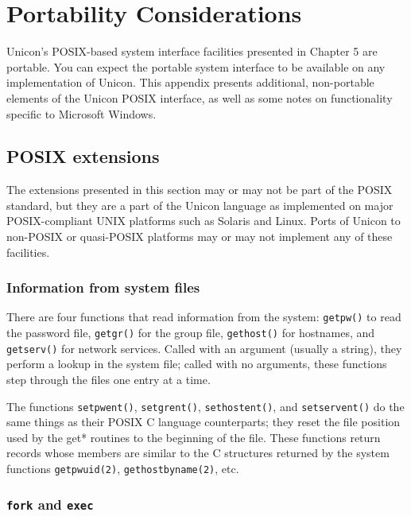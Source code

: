 \chapter{Portability Considerations}

Unicon's POSIX-based system interface facilities presented in Chapter
5 are portable.  You can expect the portable system interface to be
available on any implementation of Unicon. This appendix presents
additional, non-portable elements of the Unicon POSIX interface, as
well as some notes on functionality specific to Microsoft Windows.

\section{POSIX extensions}

The extensions presented in this section may
or may not be part of the POSIX standard, but they are a part of the
Unicon language as implemented on major POSIX-compliant UNIX platforms
such as Solaris and Linux. Ports of Unicon to non-POSIX or quasi-POSIX
platforms may or may not implement any of these facilities.

\subsection*{Information from system files}

There are four functions that read information from the system:
\texttt{getpw()} to read the password file, \texttt{getgr()} for the
group file, \texttt{gethost()} for hostnames, and \texttt{getserv()}
for network services. Called with an argument (usually a string), they
perform a lookup in the system file; called with no arguments,
these functions step through the files one entry at a time.

The functions \texttt{setpwent()}, \texttt{setgrent()},
\texttt{sethostent()}, and \texttt{setservent()} do the same things as
their POSIX C language counterparts; they reset the file position used
by the get* routines to the beginning of the file.  These functions
return records whose members are similar to the C structures returned
by the system functions \texttt{getpwuid(2)},
\texttt{gethostbyname(2)}, etc.

\subsection*{\texttt{fork} and \texttt{exec}}

